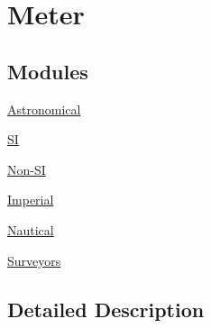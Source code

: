 \hypertarget{group___e_g_x_math-_conversions-_length_conversions-_s_i-_meter}{}\section{Meter}
\label{group___e_g_x_math-_conversions-_length_conversions-_s_i-_meter}
\subsection*{Modules}
\begin{DoxyCompactItemize}
\item 
\mbox{\hyperlink{group___e_g_x_math-_conversions-_length_conversions-_s_i-_meter-_astronomical}{Astronomical}}
\item 
\mbox{\hyperlink{group___e_g_x_math-_conversions-_length_conversions-_s_i-_meter-_s_i}{SI}}
\item 
\mbox{\hyperlink{group___e_g_x_math-_conversions-_length_conversions-_s_i-_meter-_non-_s_i}{Non-\/\+SI}}
\item 
\mbox{\hyperlink{group___e_g_x_math-_conversions-_length_conversions-_s_i-_meter-_imperial}{Imperial}}
\item 
\mbox{\hyperlink{group___e_g_x_math-_conversions-_length_conversions-_s_i-_meter-_nautical}{Nautical}}
\item 
\mbox{\hyperlink{group___e_g_x_math-_conversions-_length_conversions-_s_i-_meter-_surveyors}{Surveyors}}
\end{DoxyCompactItemize}


\subsection{Detailed Description}

